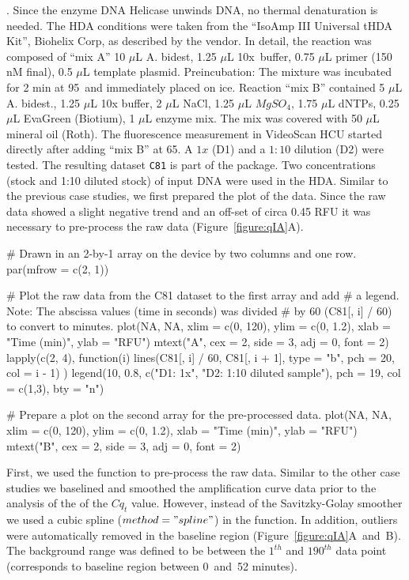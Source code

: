 \citep{roediger_RJ_2013, rodiger_highly_2013}. Since the enzyme DNA Helicase 
unwinds DNA, no thermal denaturation is needed. The HDA conditions were taken 
from the ``IsoAmp III Universal tHDA Kit'', Biohelix Corp, as described by the 
vendor. In detail, the reaction was composed of ``mix A'' 10 $\mu$L A. bidest, 
1.25 $\mu$L 10x~buffer, 0.75 $\mu$L primer (150 nM final), 0.5 $\mu$L template 
plasmid. Preincubation: The mixture was incubated for 2 min at 
95\textcelsius~and immediately placed on ice. Reaction ``mix B'' contained 5 
$\mu$L A. bidest., 1.25 $\mu$L 10x buffer, 2 $\mu$L NaCl, 1.25 $\mu$L 
$MgSO_{4}$, 1.75 $\mu$L dNTPs, 0.25 $\mu$L EvaGreen (Biotium), 1 $\mu$L enzyme 
mix. The mix was covered with 50 $\mu$L mineral oil (Roth). The fluorescence 
measurement in VideoScan HCU started directly after adding ``mix B'' at 
65\textcelsius. A $1x$ (D1) and a $1:10$ dilution (D2) were tested. The 
resulting dataset \texttt{C81} is part of the  package. Two 
concentrations (stock and 1:10 diluted stock) of input DNA were used in the 
HDA. 
Similar to the previous case studies, we first prepared the plot of the data. 
Since the raw data showed a slight negative trend and an off-set of circa 0.45 
RFU it was necessary to pre-process the raw data (Figure~\ref{figure:qIA}A).

\begin{example}
# Drawn in an 2-by-1 array on the device by two columns and one row.
par(mfrow = c(2, 1))

# Plot the raw data from the C81 dataset to the first array and add
# a legend. Note: The abscissa values (time in seconds) was divided 
# by 60 (C81[, i] / 60) to convert to minutes.
plot(NA, NA, xlim = c(0, 120), ylim = c(0, 1.2), xlab = "Time (min)", ylab = "RFU")
mtext("A", cex = 2, side = 3, adj = 0, font = 2)
lapply(c(2, 4), function(i) {
  lines(C81[, i] / 60, C81[, i + 1], type = "b", pch = 20, col = i - 1)
})
legend(10, 0.8, c("D1: 1x", "D2: 1:10 diluted sample"), pch = 19, col = c(1,3), bty = "n")

# Prepare a plot on the second array for the pre-processed data.
plot(NA, NA, xlim = c(0, 120), ylim = c(0, 1.2), xlab = "Time (min)", ylab = "RFU")
mtext("B", cex = 2, side = 3, adj = 0, font = 2)
\end{example}

First, we used the  function to pre-process the raw data. Similar to 
the other case studies we baselined and smoothed the amplification curve data 
prior to the analysis of the of the $Cq_{t}$ value. However, instead of the 
Savitzky-Golay smoother we used a cubic spline ($method = "spline"$) in the 
 function. In addition, outliers were automatically removed in the 
baseline region (Figure~\ref{figure:qIA}A~and~B). The background range was 
defined to be between the $1^{th}$ and $190^{th}$ data point (corresponds to 
baseline region between 0~and~52 minutes).

